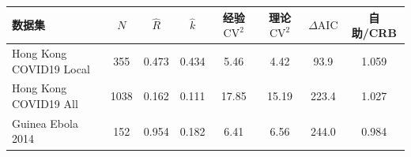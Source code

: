\begin{tabular}{lccccccc}
\toprule
数据集 & $N$ & $\hat R$ & $\hat k$ & 经验 $\text{CV}^2$ & 理论 $\text{CV}^2$ & $\Delta\text{AIC}$ & 自助/CRB \\
\midrule
Hong Kong COVID19 Local & 355 & 0.473 & 0.434 & 5.46 & 4.42 & 93.9 & 1.059 \\
Hong Kong COVID19 All & 1038 & 0.162 & 0.111 & 17.85 & 15.19 & 223.4 & 1.027 \\
Guinea Ebola 2014 & 152 & 0.954 & 0.182 & 6.41 & 6.56 & 244.0 & 0.984 \\
\bottomrule
\end{tabular}
